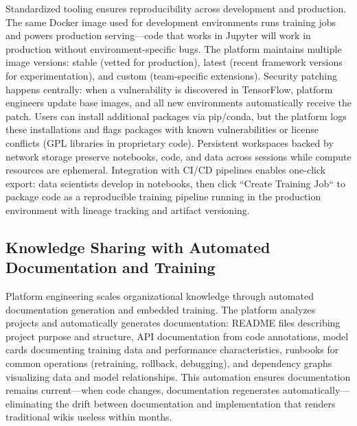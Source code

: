 Standardized tooling ensures reproducibility across development and production. The same Docker image used for development environments runs training jobs and powers production serving---code that works in Jupyter will work in production without environment-specific bugs. The platform maintains multiple image versions: stable (vetted for production), latest (recent framework versions for experimentation), and custom (team-specific extensions). Security patching happens centrally: when a vulnerability is discovered in TensorFlow, platform engineers update base images, and all new environments automatically receive the patch. Users can install additional packages via pip/conda, but the platform logs these installations and flags packages with known vulnerabilities or license conflicts (GPL libraries in proprietary code). Persistent workspaces backed by network storage preserve notebooks, code, and data across sessions while compute resources are ephemeral. Integration with CI/CD pipelines enables one-click export: data scientists develop in notebooks, then click ``Create Training Job`` to package code as a reproducible training pipeline running in the production environment with lineage tracking and artifact versioning.

\subsection{Knowledge Sharing with Automated Documentation and Training}

Platform engineering scales organizational knowledge through automated documentation generation and embedded training. The platform analyzes projects and automatically generates documentation: README files describing project purpose and structure, API documentation from code annotations, model cards documenting training data and performance characteristics, runbooks for common operations (retraining, rollback, debugging), and dependency graphs visualizing data and model relationships. This automation ensures documentation remains current---when code changes, documentation regenerates automatically---eliminating the drift between documentation and implementation that renders traditional wikis useless within months.

